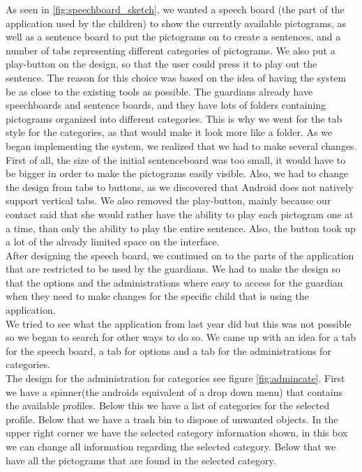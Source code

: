 As seen in \autoref{fig:speechboard_sketch}, we wanted a speech board (the part of the application used by the children) to show the currently available pictograms, as well as a sentence board to put the pictograms on to create a sentences, and a number of tabs representing different categories of pictograms. We also put a play-button on the design, so that the user could press it to play out the sentence.\newline
The reason for this choice was based on the idea of having the system be as close to the existing tools as possible. The guardians already have speechboards and sentence boards, and they have lots of folders containing pictograms organized into different categories. This is why we went for the tab style for the categories, as that would make it look more like a folder.\newline
As we began implementing the system, we realized that we had to make several changes. First of all, the size of the initial sentenceboard was too small, it would have to be bigger in order to make the pictograms easily visible. Also, we had to change the design from tabs to buttons, as we discovered that Android does not natively support vertical tabs. We also removed the play-button, mainly because our contact said that she would rather have the ability to play each pictogram one at a time, than only the ability to play the entire sentence. Also, the button took up a lot of the already limited space on the interface.\newline
\\
After designing the speech board, we continued on to the parts of the application that are restricted to be used by the guardians. We had to make the design so that the options and the administrations where easy to access for the guardian when they need to make changes for the specific child that is using the application. 
\\
We tried to see what the application from last year did but this was not possible so we began to search for other ways to do so. We came up with an idea for a tab for the speech board, a tab for options and a tab for the administrations for categories.\\

The design for the administration for categories see figure \ref{fig:admincate}. First we have a spinner(the androids equivalent of a drop down menu) that contains the available profiles. Below this we have a list of  categories for the selected profile. Below that we have a trash bin to dispose of unwanted objects. In the upper right corner we have the selected category information shown, in this box we can change all information regarding the selected category. Below that we have all the pictograms that are found in the selected category.       

